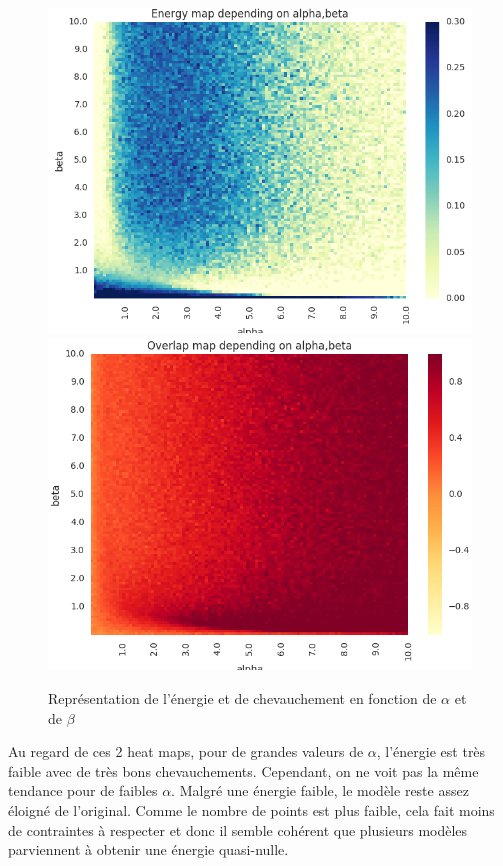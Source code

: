 \documentclass[twocolumn]{article}
\begin{document}
		\begin{figure}
			\caption{\label{ex2}Représentation de l'énergie et de chevauchement en fonction de $\alpha$ et de $\beta$}
			\includegraphics[width=\columnwidth]{../tobekept/ex2_2323132067031870085-r.png}
			\includegraphics[width=\columnwidth]{../tobekept/ex3_2323132067031870085-r.png}
		\end{figure}
		Au regard de ces 2 heat maps, pour de grandes valeurs de $\alpha$, l'énergie est très faible avec de très bons chevauchements. Cependant, on ne voit pas la même tendance pour de faibles $\alpha$. Malgré une énergie faible, le modèle reste assez éloigné de l'original. Comme le nombre de points est plus faible, cela fait moins de contraintes à respecter et donc il semble cohérent que plusieurs modèles parviennent à obtenir une énergie quasi-nulle. 
\end{document}
